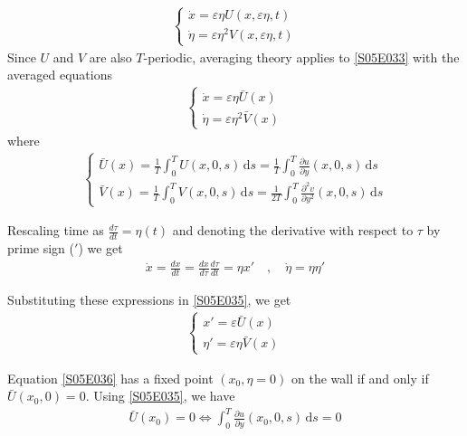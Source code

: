 \begin{solution}[6.2]
\begin{align}
	\begin{cases}
		\dot{x} = \varepsilon \eta U(x,\varepsilon \eta, t) \\
		\dot{\eta} = \varepsilon \eta^2 V(x, \varepsilon \eta,t)
	\end{cases}
\end{align}
Since $U$ and $V$ are also $T$-periodic, averaging theory applies to \eqref{S05E033} with the averaged equations
\begin{align}\label{S05E034}
	\begin{cases}
		\dot{x} = \varepsilon \eta \bar{U}(x) \\
		\dot{\eta} = \varepsilon \eta^2 \bar{V}(x)
	\end{cases}
\end{align}
where
\begin{align}\label{S05E035}
	\begin{cases}
		\displaystyle \bar{U}(x) = \frac{1}{T} \int_0^T U(x,0,s)\,\text{d}s = \frac{1}{T} \int_0^T \frac{\partial u}{\partial y}(x,0,s)\,\text{d}s \\
		\displaystyle \bar{V}(x) = \frac{1}{T} \int_0^T V(x,0,s)\,\text{d}s = \frac{1}{2T} \int_0^T \frac{\partial^2 v}{\partial y^2}(x,0,s)\,\text{d}s
	\end{cases}
\end{align}

Rescaling time as $\displaystyle \frac{d\tau}{dt}=\eta(t)$ and denoting the derivative with respect to $\tau$ by prime sign ($'$) we get
\begin{align}
	\dot{x} = \frac{dx}{dt} = \frac{dx}{d\tau}\frac{d\tau}{dt} = \eta x' \quad , \quad \dot{\eta}= \eta \eta'
\end{align}

Substituting these expressions in \eqref{S05E035}, we get
\begin{align}\label{S05E036}
	\begin{cases}
		x' = \varepsilon \bar{U}(x) \\
		\eta' = \varepsilon \eta \bar{V}(x)
	\end{cases}
\end{align}

Equation \eqref{S05E036} has a fixed point $(x_0, \eta=0)$ on the wall if and only if $\bar{U}(x_0,0)=0$. Using \eqref{S05E035}, we have
\begin{align}\label{S05E037}
	\bar{U}(x_0) = 0 \Longleftrightarrow \boxed{\int_0^T \frac{\partial u}{\partial y}(x_0,0,s)\,\text{d}s = 0}
\end{align}


\end{solution}
